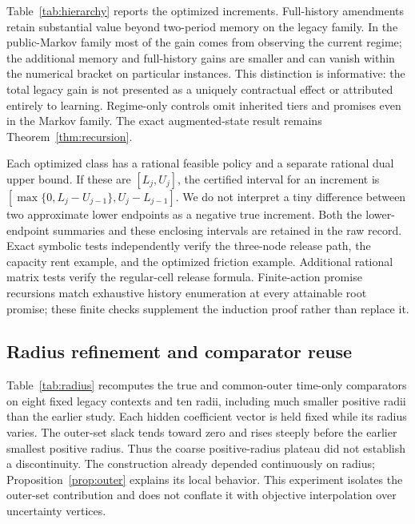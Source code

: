 Table~\ref{tab:hierarchy} reports the optimized increments. Full-history amendments retain substantial value beyond two-period memory on the legacy family. In the public-Markov family most of the gain comes from observing the current regime; the additional memory and full-history gains are smaller and can vanish within the numerical bracket on particular instances. This distinction is informative: the total legacy gain is not presented as a uniquely contractual effect or attributed entirely to learning. Regime-only controls omit inherited tiers and promises even in the Markov family. The exact augmented-state result remains Theorem~\ref{thm:recursion}.



Each optimized class has a rational feasible policy and a separate rational dual upper bound. If these are $[L_j,U_j]$, the certified interval for an increment is
$[\max\{0,L_j-U_{j-1}\},U_j-L_{j-1}]$. We do not interpret a tiny difference between two approximate lower endpoints as a negative true increment. Both the lower-endpoint summaries and these enclosing intervals are retained in the raw record. Exact symbolic tests independently verify the three-node release path, the capacity rent example, and the optimized friction example. Additional rational matrix tests verify the regular-cell release formula. Finite-action promise recursions match exhaustive history enumeration at every attainable root promise; these finite checks supplement the induction proof rather than replace it.

\subsection{Radius refinement and comparator reuse}
Table~\ref{tab:radius} recomputes the true and common-outer time-only comparators on eight fixed legacy contexts and ten radii, including much smaller positive radii than the earlier study. Each hidden coefficient vector is held fixed while its radius varies. The outer-set slack tends toward zero and rises steeply before the earlier smallest positive radius. Thus the coarse positive-radius plateau did not establish a discontinuity. The construction already depended continuously on radius; Proposition~\ref{prop:outer} explains its local behavior. This experiment isolates the outer-set contribution and does not conflate it with objective interpolation over uncertainty vertices.


